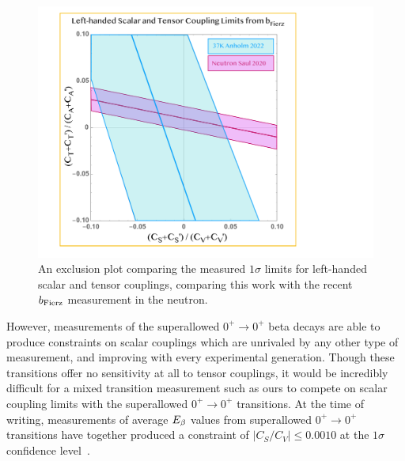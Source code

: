 \note{}
\begin{figure}[h!t!b!]
	\centering
	\includegraphics[width=.999\linewidth]{Figures/ScalarTensorLimits.pdf}
	\caption[An exclusion plot for left-handed scalar and tensor couplings comparing this work with the recent $\bFierz$ measurement in the neutron]{An exclusion plot comparing the measured $1\sigma$ limits for left-handed scalar and tensor couplings, comparing this work with the recent $\bFierz$ measurement in the neutron\cite{Saul2020}.}
	\label{fig:exclusionplotfromjohn}
\end{figure}

However, measurements of the superallowed $0^+ \rightarrow 0^+$ beta decays are able to produce constraints on scalar couplings which are unrivaled by any other type of measurement, and improving with every experimental generation.  Though these transitions offer no sensitivity at all to tensor couplings, it would be incredibly difficult for a mixed transition measurement such as ours to compete on scalar coupling limits with the superallowed $0^+ \rightarrow 0^+$ transitions.  
At the time of writing, measurements of average $E_{\beta}$ values from superallowed $0^+ \rightarrow 0^+$ transitions have together produced a constraint of \mbox{$\left| C_S / C_V \right| \leq 0.0010$} at the $1\sigma$ confidence level~\cite{HardyTownerSuperallowed2020}.
\note{}

